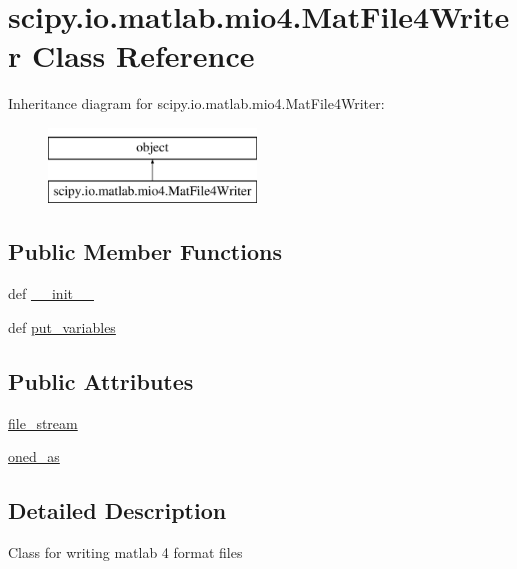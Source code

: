 \hypertarget{classscipy_1_1io_1_1matlab_1_1mio4_1_1MatFile4Writer}{}\section{scipy.\+io.\+matlab.\+mio4.\+Mat\+File4\+Writer Class Reference}
\label{classscipy_1_1io_1_1matlab_1_1mio4_1_1MatFile4Writer}
Inheritance diagram for scipy.\+io.\+matlab.\+mio4.\+Mat\+File4\+Writer\+:\begin{figure}[H]
\begin{center}
\leavevmode
\includegraphics[height=2.000000cm]{classscipy_1_1io_1_1matlab_1_1mio4_1_1MatFile4Writer}
\end{center}
\end{figure}
\subsection*{Public Member Functions}
\begin{DoxyCompactItemize}
\item 
def \hyperlink{classscipy_1_1io_1_1matlab_1_1mio4_1_1MatFile4Writer_a74e884c70bd653144ebbb44d7ad2859a}{\+\_\+\+\_\+init\+\_\+\+\_\+}
\item 
def \hyperlink{classscipy_1_1io_1_1matlab_1_1mio4_1_1MatFile4Writer_a9d30f062bae71d7eebb40b4ce020f97c}{put\+\_\+variables}
\end{DoxyCompactItemize}
\subsection*{Public Attributes}
\begin{DoxyCompactItemize}
\item 
\hyperlink{classscipy_1_1io_1_1matlab_1_1mio4_1_1MatFile4Writer_a0bcc6a785ce86718c740c0fc19cb59d4}{file\+\_\+stream}
\item 
\hyperlink{classscipy_1_1io_1_1matlab_1_1mio4_1_1MatFile4Writer_a106059d84228c76e91366d4580f1a44c}{oned\+\_\+as}
\end{DoxyCompactItemize}


\subsection{Detailed Description}
\begin{DoxyVerb}Class for writing matlab 4 format files \end{DoxyVerb}
 

